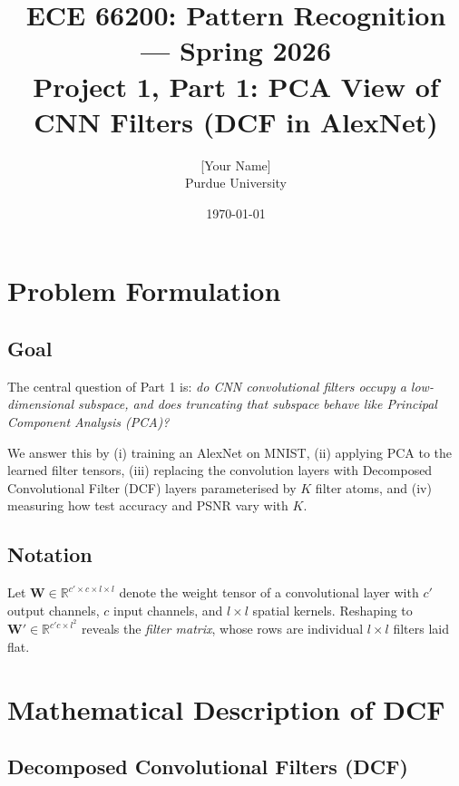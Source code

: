 \documentclass[11pt,letterpaper]{article}
\title{\textbf{ECE 66200: Pattern Recognition — Spring 2026}\\[4pt]
       \Large Project 1, Part 1: PCA View of CNN Filters (DCF in AlexNet)}
\author{[Your Name] \\ Purdue University}
\date{\today}
\newcommand{\R}{\mathbb{R}}
\newcommand{\W}{\mathbf{W}}
\begin{document}
\maketitle
\tableofcontents
\newpage

\section{Problem Formulation}
\label{sec:formulation}

\subsection{Goal}

The central question of Part 1 is: \emph{do CNN convolutional filters occupy a
low-dimensional subspace, and does truncating that subspace behave like
Principal Component Analysis (PCA)?}

We answer this by (i) training an AlexNet on MNIST, (ii) applying PCA to the
learned filter tensors, (iii) replacing the convolution layers with
Decomposed Convolutional Filter (DCF) layers parameterised by
$K$ filter atoms, and (iv) measuring how test accuracy and PSNR vary with $K$.

\subsection{Notation}

Let $\W \in \R^{c' \times c \times l \times l}$ denote the weight tensor of a
convolutional layer with $c'$ output channels, $c$ input channels, and
$l \times l$ spatial kernels.  Reshaping to
$\W' \in \R^{c'c \times l^2}$ reveals the \emph{filter matrix}, whose rows
are individual $l \times l$ filters laid flat.

\section{Mathematical Description of DCF}
\label{sec:dcf_math}

\subsection{Decomposed Convolutional Filters (DCF)}
\end{document}
